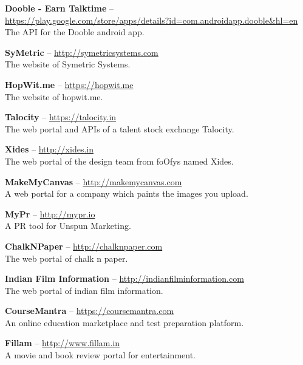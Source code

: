 \documentclass[11pt,a4paper]{moderncv}
\begin{document}
\cvlistitem
{\textbf{Dooble - Earn Talktime} -- \\ {\small \href{https://play.google.com/store/apps/details?id=com.androidapp.dooble\&hl=en}{https://play.google.com/store/apps/details?id=com.androidapp.dooble\&hl=en}}  
  \\The API for the Dooble android app.
}

\cvlistitem
{\textbf{SyMetric} -- {\small \href{http://symetricsystems.com}{http://symetricsystems.com}}  
  \\The website of Symetric Systems.
}

\cvlistitem
{\textbf{HopWit.me} -- {\small \href{https://hopwit.me}{https://hopwit.me}}  
  \\The website of hopwit.me.
}

\cvlistitem
{\textbf{Talocity} -- {\small \href{https://talocity.in}{https://talocity.in}}  
  \\The web portal and APIs of a talent stock exchange Talocity.
}

\cvlistitem
{\textbf{Xides} -- {\small \href{http://xides.in}{http://xides.in}}
  \\The web portal of the design team from foOfys named Xides.
}

\cvlistitem
{\textbf{MakeMyCanvas} -- {\small \href{http://makemycanvas.com}{http://makemycanvas.com}}
  \\A web portal for a company which paints the images you upload.
}

\cvlistitem
{\textbf{MyPr} -- {\small \href{http://mypr.io}{http://mypr.io}}
  \\A PR tool for Unspun Marketing.
}

\cvlistitem
{\textbf{ChalkNPaper} -- {\small \href{http://chalknpaper.com}{http://chalknpaper.com}}
  \\The web portal of chalk n paper.
}

\cvlistitem
{\textbf{Indian Film Information} -- {\small \href{http://indianfilminformation.com}{http://indianfilminformation.com}}
  \\The web portal of indian film information.
}

\cvlistitem
{\textbf{CourseMantra} -- {\small \href{https://coursemantra.com}{https://coursemantra.com}}
  \\An online education marketplace and test preparation platform.
}

\cvlistitem
{\textbf{Fillam} -- {\small \href{http://www.fillam.in}{http://www.fillam.in}}
  \\A movie and book review portal for entertainment.
}
\end{document}
